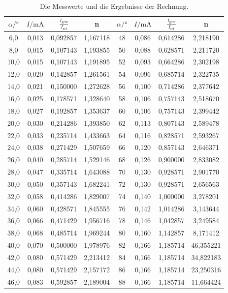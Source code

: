 \begin{table}
  \centering
  \caption{Die Messwerte und die Ergebnisse der Rechnung.}
  \label{tab:mess1}
  \begin{tabular}{c c c c c c c c}
    \toprule
    $\alpha / °$ &     $I / \unit{\milli\ampere}$ & $\frac{I_\text{gem}}{I_\text{ref}}$ & n &$\alpha / °$ &    $I / \unit{\milli\ampere}$ & $\frac{I_\text{gem}}{I_\text{ref}}$& n \\
    \midrule
       6,0 & 0,013 &  0,092857 & 1,167118 &48 & 0,086 & 0,614286 &  2,218190 \\
       8,0 & 0,015 &  0,107143 & 1,193855 &50 & 0,088 & 0,628571 &  2,211720 \\
      10,0 & 0,015 &  0,107143 & 1,191895 &52 & 0,093 & 0,664286 &  2,302198 \\
      12,0 & 0,020 &  0,142857 & 1,261561 &54 & 0,096 & 0,685714 &  2,322735 \\
      14,0 & 0,021 &  0,150000 & 1,272628 &56 & 0,100 & 0,714286 &  2,377642 \\
      16,0 & 0,025 &  0,178571 & 1,328640 &58 & 0,106 & 0,757143 &  2,518670 \\
      18,0 & 0,027 &  0,192857 & 1,353637 &60 & 0,106 & 0,757143 &  2,399442 \\
      20,0 & 0,030 &  0,214286 & 1,393850 &62 & 0,113 & 0,807143 &  2,589478 \\
      22,0 & 0,033 &  0,235714 & 1,433663 &64 & 0,116 & 0,828571 &  2,593267 \\
      24,0 & 0,038 &  0,271429 & 1,507659 &66 & 0,120 & 0,857143 &  2,646371 \\
      26,0 & 0,040 &  0,285714 & 1,529146 &68 & 0,126 & 0,900000 &  2,833082 \\
      28,0 & 0,047 &  0,335714 & 1,643088 &70 & 0,130 & 0,928571 &  2,901770 \\
      30,0 & 0,050 &  0,357143 & 1,682241 &72 & 0,130 & 0,928571 &  2,656563 \\
      32,0 & 0,058 &  0,414286 & 1,829007 &74 & 0,140 & 1,000000 &  3,278201 \\
      34,0 & 0,060 &  0,428571 & 1,845555 &76 & 0,142 & 1,014286 &  3,143644 \\
      36,0 & 0,066 &  0,471429 & 1,956716 &78 & 0,146 & 1,042857 &  3,249584 \\
      38,0 & 0,068 &  0,485714 & 1,969244 &80 & 0,160 & 1,142857 &  8,171412 \\
      40,0 & 0,070 &  0,500000 & 1,978976 &82 & 0,166 & 1,185714 & 46,355221 \\
      42,0 & 0,080 &  0,571429 & 2,213412 &84 & 0,166 & 1,185714 & 34,822183 \\
      44,0 & 0,080 &  0,571429 & 2,157172 &86 & 0,166 & 1,185714 & 23,250316 \\
      46,0 & 0,083 &  0,592857 & 2,189004 &88 & 0,166 & 1,185714 & 11,664424 \\
    \bottomrule
    \end{tabular}
\end{table}

